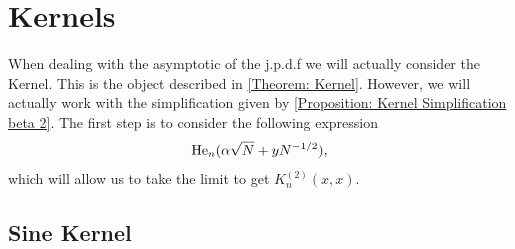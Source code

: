 \section{Kernels}

When dealing with the asymptotic of the j.p.d.f we will actually consider the Kernel. This is the object described in \ref{Theorem: Kernel}. However, we will actually work with the simplification given by \ref{Proposition: Kernel Simplification beta 2}. The first step is to consider the following expression
\begin{equation}
	\mathrm{He}_n(\alpha \sqrt{N} + y N^{-1/2}),
\end{equation}
which will allow us to take the limit to get $K_n^{(2)}(x,x)$.

\subsection{Sine Kernel}

